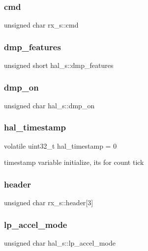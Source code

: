 \subsubsection{cmd}
{\footnotesize\ttfamily unsigned char rx\+\_\+s\+::cmd}

\mbox{\label{group__e_m_p_l_gaddd6cb7910e57a7196ac6ce64aa0f707}} 
\subsubsection{dmp\+\_\+features}
{\footnotesize\ttfamily unsigned short hal\+\_\+s\+::dmp\+\_\+features}

\mbox{\label{group__e_m_p_l_ga74fc0678cdb732ca77b8bfe8c8fb00df}} 
\subsubsection{dmp\+\_\+on}
{\footnotesize\ttfamily unsigned char hal\+\_\+s\+::dmp\+\_\+on}

\mbox{\label{group__e_m_p_l_ga359d30cf3d94f8046df41f14467c36de}} 
\subsubsection{hal\+\_\+timestamp}
{\footnotesize\ttfamily volatile uint32\+\_\+t hal\+\_\+timestamp = 0}



timestamp variable initialize, its for count tick 

\mbox{\label{group__e_m_p_l_ga56962a58a26d80a33025ef500242f51b}} 
\subsubsection{header}
{\footnotesize\ttfamily unsigned char rx\+\_\+s\+::header[3]}

\mbox{\label{group__e_m_p_l_ga2495005d08cae39a0c73412eef93fa96}} 
\subsubsection{lp\+\_\+accel\+\_\+mode}
{\footnotesize\ttfamily unsigned char hal\+\_\+s\+::lp\+\_\+accel\+\_\+mode}

